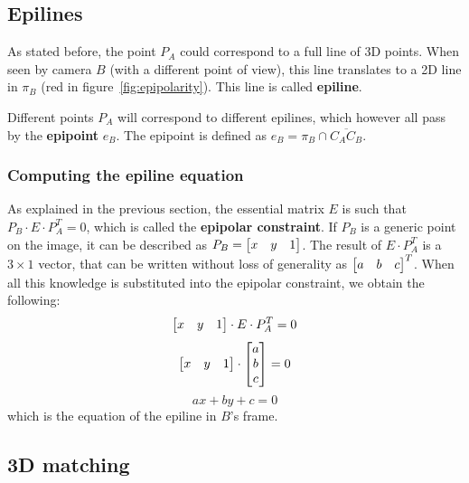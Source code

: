 \subsection{Epilines}

As stated before, the point $P_A$ could correspond to a full line of 3D points.
When seen by camera $B$ (with a different point of view), this line translates to a 2D line in $\pi_B$ (red in figure~\ref{fig:epipolarity}).
This line is called \textbf{epiline}.

Different points $P_A$ will correspond to different epilines, which however all pass by the \textbf{epipoint} $e_B$.
The epipoint is defined as $e_B = \pi_B \cap \overline{C_AC_B}$.

\subsubsection{Computing the epiline equation}

As explained in the previous section, the essential matrix $E$ is such that $P_B \cdot E \cdot P_A^T = 0$, which is called the \textbf{epipolar constraint}.
If $P_B$ is a generic point on the image, it can be described as $P_B = \begin{bmatrix} x & y & 1 \end{bmatrix}$.
The result of $E \cdot P_A^T$ is a $3\times 1$ vector, that can be written without loss of generality as $\begin{bmatrix} a & b & c \end{bmatrix}^T$.
When all this knowledge is substituted into the epipolar constraint, we obtain the following:
\begin{equation}
	\begin{bmatrix} x & y & 1 \end{bmatrix} \cdot E \cdot P_A^T = 0\\
\end{equation}
\begin{equation}
	\begin{bmatrix} x & y & 1 \end{bmatrix} \cdot \begin{bmatrix} a \\ b \\ c \end{bmatrix} = 0\\
\end{equation}
\begin{equation}
	ax + by + c = 0
\end{equation}
which is the equation of the epiline in $B$'s frame.


\subsection{3D matching}

